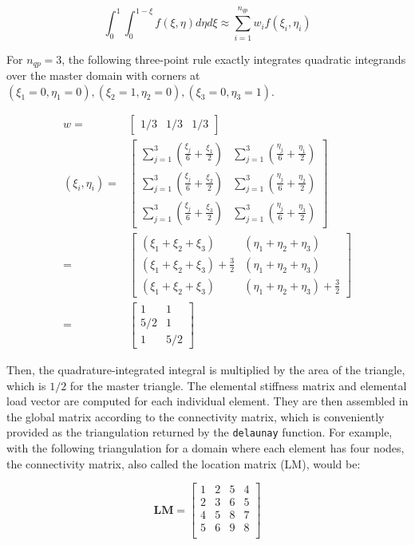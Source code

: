 \documentclass[10pt]{article}
\newcommand{\beq}{\begin{equation}}
\newcommand{\eeq}{\end{equation}}
\newcommand{\beqa}{\begin{equation}\begin{aligned}}
\newcommand{\eeqa}{\end{aligned}\end{equation}}
\begin{document}
\beq
\int_{0}^{1} \int_{0}^{1-\xi}f(\xi,\eta)d\eta d\xi\approx\sum_{i=1}^{n_{qp}}w_if(\xi_i,\eta_i)
\eeq

For \(n_{qp}=3\), the following three-point rule exactly integrates quadratic integrands over the master domain with corners at \((\xi_1=0,\eta_1=0), (\xi_2=1,\eta_2=0), (\xi_3=0,\eta_3=1)\).

\beqa
w=&\begin{bmatrix}1/3& 1/3& 1/3\end{bmatrix}\\
(\xi_i,\eta_i)=&\begin{bmatrix}\sum_{j=1}^3\left(\frac{\xi_j}{6}+\frac{\xi_1}{2}\right) & \sum_{j=1}^3\left(\frac{\eta_j}{6}+\frac{\eta_1}{2}\right)\\
\sum_{j=1}^3\left(\frac{\xi_j}{6}+\frac{\xi_2}{2}\right) & \sum_{j=1}^3\left(\frac{\eta_j}{6}+\frac{\eta_2}{2}\right)\\
\sum_{j=1}^3\left(\frac{\xi_j}{6}+\frac{\xi_3}{2}\right) & \sum_{j=1}^3\left(\frac{\eta_j}{6}+\frac{\eta_3}{2}\right)
 \end{bmatrix}\\
=&\begin{bmatrix}\left(\xi_1+\xi_2+\xi_3\right) & \left(\eta_1+\eta_2+\eta_3\right)\\
\left(\xi_1+\xi_2+\xi_3\right)+\frac{3}{2} & \left(\eta_1+\eta_2+\eta_3\right)\\
\left(\xi_1+\xi_2+\xi_3\right) & \left(\eta_1+\eta_2+\eta_3\right)+\frac{3}{2}
 \end{bmatrix}\\
 =&\begin{bmatrix}1 & 1\\
5/2 & 1\\
1 & 5/2
 \end{bmatrix}
\eeqa

Then, the quadrature-integrated integral is multiplied by the area of the triangle, which is \(1/2\) for the master triangle. The elemental stiffness matrix and elemental load vector are computed for each individual element. They are then assembled in the global matrix according to the connectivity matrix, which is conveniently provided as the triangulation returned by the {\tt delaunay} function. For example, with the following triangulation for a domain where each element has four nodes, the connectivity matrix, also called the location matrix (LM), would be:

\begin{equation}
\textbf{LM}=\begin{bmatrix}
1 & 2 & 5 & 4\\
2 & 3 & 6 & 5\\
4 & 5 & 8 & 7\\
5 & 6 & 9 & 8\\
\end{bmatrix}
\end{equation}
\end{document}
